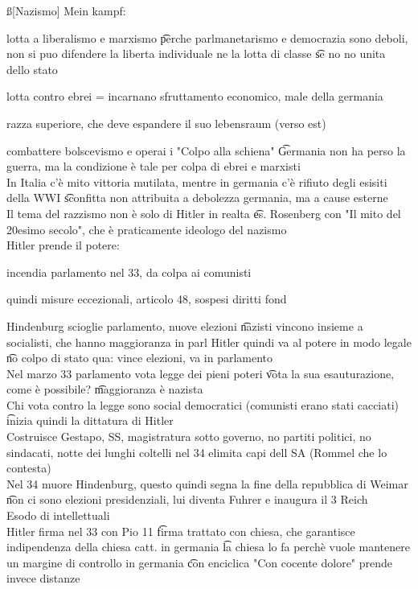 \documentclass[12pt]{article}
\begin{document}
\ss[Nazismo]
Mein kampf:
\bi
  \item lotta a liberalismo e marxismo \t perche parlmanetarismo e democrazia sono deboli, non si puo difendere la liberta individuale ne la lotta di classe \t se no no unita dello stato
  \item lotta contro ebrei = incarnano sfruttamento economico, male della germania
  \item razza superiore, che deve espandere il suo lebensraum (verso est)
  \item combattere bolscevismo e operai
\ei
i
"Colpo alla schiena" \t Germania non ha perso la guerra, ma la condizione è tale per colpa di ebrei e marxisti \\
In Italia c'è mito vittoria mutilata, mentre in germania c'è rifiuto degli esisiti della WWI \t sconfitta non attribuita a debolezza germania, ma a cause esterne \\
Il tema del razzismo non è solo di Hitler in realta \t es. Rosenberg con "Il mito del 20esimo secolo", che è praticamente ideologo del nazismo \\
Hitler prende il potere:
\bi
\item incendia parlamento nel 33, da colpa ai comunisti
\item quindi misure eccezionali, articolo 48, sospesi diritti fond
\item Hindenburg scioglie parlamento, nuove elezioni \t nazisti vincono insieme a socialisti, che hanno maggioranza in parl
\ei
Hitler quindi va al potere in modo legale \t no colpo di stato qua: vince elezioni, va in parlamento \\
Nel marzo 33 parlamento vota legge dei pieni poteri \t vota la sua esauturazione, come è possibile? \t maggioranza è nazista \\
Chi vota contro la legge sono social democratici (comunisti erano stati cacciati) \t inizia quindi la dittatura di Hitler \\
Costruisce Gestapo, SS, magistratura sotto governo, no partiti politici, no sindacati, notte dei lunghi coltelli nel 34 elimita capi dell SA (Rommel che lo contesta) \\
Nel 34 muore Hindenburg, questo quindi segna la fine della repubblica di Weimar \t non ci sono elezioni presidenziali, lui diventa Fuhrer e inaugura il 3 Reich \\
Esodo di intellettuali \\
Hitler firma nel 33 con Pio 11 \t firma trattato con chiesa, che garantisce indipendenza della chiesa catt. in germania \t la chiesa lo fa perchè vuole mantenere un margine di controllo in germania \t con enciclica "Con cocente dolore" prende invece distanze \\
\end{document}
